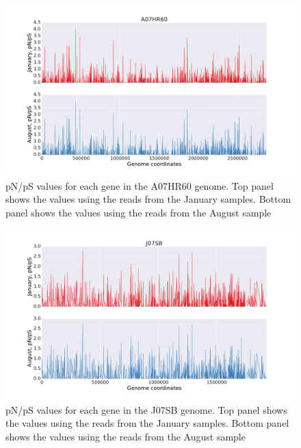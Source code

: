 \begin{figure}[p]
  \centering
  \includegraphics[width=\textwidth,height=\textheight,keepaspectratio]{Chapter5/Figures/pn_ps_plots/A07HR60_pNpS_density.pdf}
  \caption{pN/pS values for each gene in the A07HR60 genome. Top panel shows the values using the reads from the January samples. Bottom panel shows the values using the reads from the August sample}
  \label{A07HR60_pNpS}
\end{figure}

\begin{figure}[p]
  \centering
  \includegraphics[width=\textwidth,height=\textheight,keepaspectratio]{Chapter5/Figures/pn_ps_plots/J07SB_pNpS_density.pdf}
  \caption{pN/pS values for each gene in the J07SB genome. Top panel shows the values using the reads from the January samples. Bottom panel shows the values using the reads from the August sample}
  \label{J07SB_pNpS}
\end{figure}


